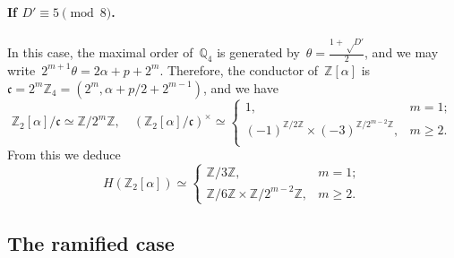 \documentclass{article}
\let\fr\mathfrak
\begin{document}
\paragraph{If $D' ≡ 5 \pmod{8}$.} In this case, the maximal order
of~$ℚ_4$ is generated by~$θ = \frac{1+√{D'}}{2}$, and we may
write~$2^{m+1} θ = 2α + p + 2^m$. Therefore, the conductor of~$ℤ[α]$
is~$\fr c = 2^{m} ℤ_4 = (2^m, α+p/2+2^{m-1})$, and we have
\begin{equation}
ℤ_2[α]/\fr c ≃ ℤ/2^m ℤ, \quad
(ℤ_2[α]/\fr c)^{×} ≃ \begin{cases} 1, & m = 1;\\
(-1)^{ℤ/2ℤ} × (-3)^{ℤ/2^{m-2}ℤ},& m ≥ 2.\\\end{cases}
\end{equation}
From this we deduce
\begin{equation}
H(ℤ_2[α]) ≃ 
\begin{cases} ℤ/3ℤ,& m = 1;\\ ℤ/6ℤ × ℤ/2^{m-2}ℤ, & m ≥ 2. \end{cases}
\end{equation}

\subsection{The ramified case}
\end{document}
